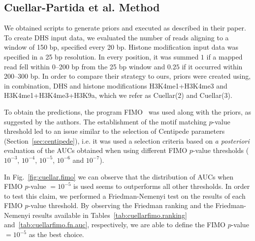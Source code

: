 \documentclass{bioinfo}
\begin{document}
\subsection{Cuellar-Partida et al. Method}
\label{sec:cuellar}

We obtained \cite{cuellar2012} scripts to generate priors and executed
as described in their paper. To create DHS input data,
we evaluated the number of reads aligning to a window of 150 bp,
specified every 20 bp. Histone modification input data was specified in
a 25 bp resolution. In every position, it was summed $ 1 $ if a mapped
read fell within 0--200 bp from the 25 bp window and $ 0.25 $ if it occurred
within 200--300 bp. In order to compare their strategy to ours, priors
were created using, in combination, DHS and histone modifications
H3K4me1+H3K4me3 and H3K4me1+H3K4me3+H3K9a, which we refer as Cuellar(2) and Cuellar(3).

To obtain the predictions, the program FIMO~\citep{grant2011} was used
along with the priors, as suggested by the authors. The establishment of
the motif matching $p$-value threshold led to an issue similar to the
selection of Centipede parameters (Section~\ref{sec:centipede}), i.e. it was
used a selection criteria based on \emph{a posteriori} evaluation of the AUCs
obtained when using different FIMO $p$-value thresholds ($ 10^{-3} $, $ 10^{-4} $,
$ 10^{-5} $, $ 10^{-6} $ and $ 10^{-7} $).

In Fig.~\ref{fig:cuellar.fimo} we can observe that the distribution
of AUCs when FIMO $p$-value $ = 10^{-5}$ is used seems to outperforms all other
thresholds. In order to test this claim, we performed a Friedman-Nemenyi test
on the results of each FIMO $p$-value threshold. By observing the Friedman
ranking and the Friedman-Nemenyi results available in Tables~\ref{tab:cuellarfimo.ranking}
and~\ref{tab:cuellarfimo.fn.auc}, respectively, we are able to define
the FIMO $p$-value $ = 10^{-5}$ as the best choice.




\end{document}
